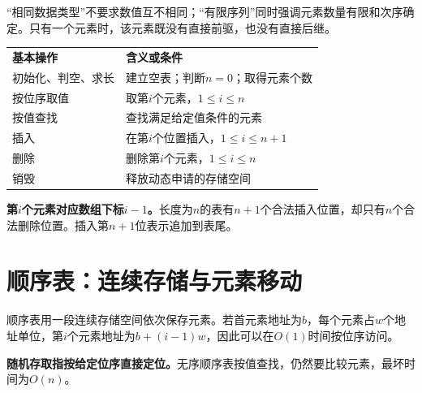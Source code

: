 \hypertarget{ds2-values}{}

“相同数据类型”不要求数值互不相同；“有限序列”同时强调元素数量有限和次序确定。只有一个元素时，该元素既没有直接前驱，也没有直接后继。


\hypertarget{ds2-operations}{}

\par\smallskip\noindent\begin{tabularx}{\linewidth}{@{}YY@{}}\toprule
{} \textbf{基本操作} & \textbf{含义或条件} \\
初始化、判空、求长 & 建立空表；判断$n=0$；取得元素个数 \\
按位序取值 & 取第$i$个元素，$1\le i\le n$ \\
按值查找 & 查找满足给定值条件的元素 \\
插入 & 在第$i$个位置插入，$1\le i\le n+1$ \\
删除 & 删除第$i$个元素，$1\le i\le n$ \\
销毁 & 释放动态申请的存储空间 \\\bottomrule\end{tabularx}\par\smallskip

\hypertarget{ds2-index}{}

\begin{takeaway}[位序与下标]
\textbf{第$i$个元素对应数组下标$i-1$。}长度为$n$的表有$n+1$个合法插入位置，却只有$n$个合法删除位置。插入第$n+1$位表示追加到表尾。
\end{takeaway}

\hypertarget{ds2-find-failure}{}


\hypertarget{ds2-array}{}

\section{顺序表：连续存储与元素移动}\label{ds2-array}

\hypertarget{ds2-seq-def}{}

顺序表用一段连续存储空间依次保存元素。若首元素地址为$b$，每个元素占$w$个地址单位，第$i$个元素地址为$b+(i-1)w$，因此可以在$O(1)$时间按位序访问。


\hypertarget{ds2-random}{}

\begin{pitfall}[按位序与按值]
\textbf{随机存取指按给定位序直接定位。}无序顺序表按值查找，仍然要比较元素，最坏时间为$O(n)$。
\end{pitfall}

